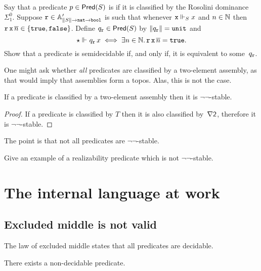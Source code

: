 \begin{exercise}
  Say that a predicate $p \in \Pred{S}$ is  if it is classified by the Rosolini dominance $\Sigma^0_1$. 
  Suppose $\R{r} \in \subAtyp{\T{S} \to \ttnat \to \ttbool}$ is such that
  whenever $\R{x} \rz[S] x$ and $n \in \NN$ then $\R{r}\,\R{x}\,\overline{n} \in \set{\combTrue, \combFalse}$. Define $q_{\R{r}} \in \Pred{S}$ by $\T{q_{\R{r}}} = \unit$ and
  \begin{equation*}
    \ttunit \rz q_{\R{r}}\,x
    \iff \some{n \in \NN} \R{r}\,\R{x}\,\overline{n} = \combTrue.
  \end{equation*}
  Show that a predicate is semidecidable if, and only if, it is equivalent to some~$q_{\R{r}}$.
\end{exercise}

One might ask whether \emph{all} predicates are classified by a two-element assembly, as that would imply that assemblies form a topos. Alas, this is not the case.

\begin{proposition}
  If a predicate is classified by a two-element assembly then it is $\lnot\lnot$-stable.
\end{proposition}

\begin{proof}
  If a predicate is classified by $T$ then it is also classified by~$\nabla \two$, therefore it is $\lnot\lnot$-stable.
\end{proof}

The point is that not all predicates are $\lnot\lnot$-stable.

\begin{exercise}
  Give an example of a realizability predicate which is not $\lnot\lnot$-stable.
\end{exercise}


\section{The internal language at work}
\label{sec:internal-language-at}

\subsection{Excluded middle is not valid}
\label{sec:excluded-middle}

The law of excluded middle states that all predicates are decidable.

\begin{proposition}
  There exists a non-decidable predicate.
\end{proposition}

